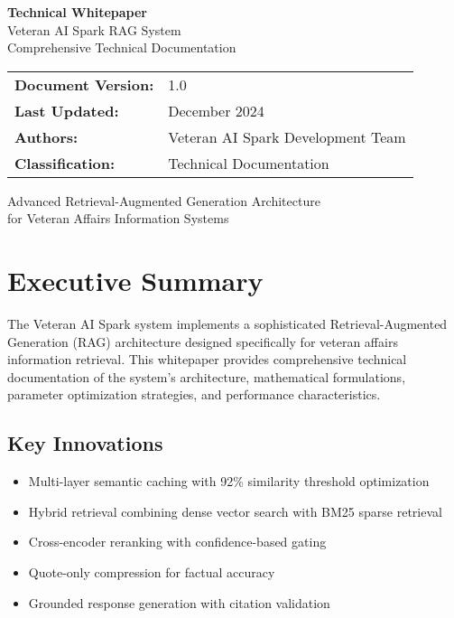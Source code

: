 \documentclass[11pt,a4paper]{article}
\begin{document}
\begin{titlepage}
    \centering
    \vspace*{2cm}
    
    {\Huge\bfseries Technical Whitepaper}\\[0.5cm]
    {\LARGE Veteran AI Spark RAG System}\\[1.5cm]
    
    {\large Comprehensive Technical Documentation}\\[2cm]
    
    \begin{tabular}{ll}
        \textbf{Document Version:} & 1.0 \\
        \textbf{Last Updated:} & December 2024 \\
        \textbf{Authors:} & Veteran AI Spark Development Team \\
        \textbf{Classification:} & Technical Documentation \\
    \end{tabular}
    
    \vfill
    
    {\large Advanced Retrieval-Augmented Generation Architecture\\
    for Veteran Affairs Information Systems}
    
    \vspace{1cm}
\end{titlepage}

\tableofcontents
\newpage

\section{Executive Summary}

The Veteran AI Spark system implements a sophisticated Retrieval-Augmented Generation (RAG) architecture designed specifically for veteran affairs information retrieval. This whitepaper provides comprehensive technical documentation of the system's architecture, mathematical formulations, parameter optimization strategies, and performance characteristics.

\subsection{Key Innovations}
\begin{itemize}
    \item Multi-layer semantic caching with 92\% similarity threshold optimization
    \item Hybrid retrieval combining dense vector search with BM25 sparse retrieval
    \item Cross-encoder reranking with confidence-based gating
    \item Quote-only compression for factual accuracy
    \item Grounded response generation with citation validation
\end{itemize}
\end{document}

